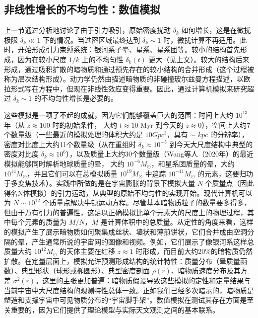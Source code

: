 
 

\subsection{非线性增长的不均匀性：数值模拟}

上一节通过分析地讨论了由于引力吸引，原始密度扰动 \( \delta_k \) 如何增长，这是在微扰极限 \( \delta_k \ll 1 \) 下的情况。当过密区域最终达到 \( \delta_k \sim 1 \) 时，微扰计算不再适用。此时，开始形成引力束缚系统：银河系子晕、星系、星系团等。较小的结构首先形成，因为在较小尺度 \( 1/k \) 上的不均匀性 \( \delta_k(t) \) 更大（见上文）。较大的结构后来形成，通过吸积扩散的暗物质和通过预先存在的较小结构的合并形成（这个过程被称为层次结构形成）。动力学仍然由描述暗物质的非碰撞玻尔兹曼方程描述，以欧拉形式写在方程中，但现在非线性效应变得重要。因此，通过计算机模拟来研究超过 \( \delta_k \sim 1 \) 的不均匀性增长是必要的。

这些模拟是一项了不起的成就，因为它们能够覆盖巨大的范围：时间上大约 \( 10^{13} \) 年（从 \( z \approx 100 \) 时的初始条件，
大约 \( t \approx 10 \) Myr 到今天的 \( z \approx 0 \)），空间上大约7个数量级（一些最近的模拟处理的体积大约是 $10 Gpc^3$，具有 \( \sim \) $kpc$ 的分辨率），密度对比度上大约11个数量级（从在重组时 \( \delta_k \approx 10^{-5} \) 到今天大尺度结构中典型的密度对比度 \( \delta_k \approx 10^6 \)），以及质量上大约30个数量级（Wang等人（2020年）的最近模拟能够同时解析地球质量的晕，
大约 \( 10^{-6} M_{\odot} \)，和星系团质量的晕，大约 \( 10^{14} M_{\odot} \)，并且它们可以在总模拟质量 \( 10^{19} M_{\odot} \) 中追踪 \( 10^{-11} M_{\odot} \) 的元素，这要归功于多变焦技术）。实践中所做的是在宇宙膨胀的背景下模拟大量 \( N \) 个质量点（因此得名N体模拟）的引力运动，从典型的原始不均匀性的实现开始。现代计算机可以为 \( N \sim 10^{12} \) 个质量点解决牛顿运动方程。尽管基本暗物质粒子的数量要多得多，但由于万有引力的普遍性，这足以正确模拟比单个元素大的尺度上的物理过程，其中每个元素的质量为 \( M/N \)，\( M \) 是计算体积中的总质量。从定性的角度来看，这样的模拟产生了展示暗物质如何聚集成丝状、墙状和薄煎饼状，它们合并成由空洞分隔的晕，产生通常所说的宇宙网的图像和视频。例如，它们展示了像银河系这样总质量大约 \( 10^{12} M_{\odot} \) 的天体主要在红移 \( z \approx 1 \) 时形成，而目前大约20\%的暗物质仍然扩散。在定量层面上，模拟允许预测形成结构的统计特性：质量分布（晕质量函数）、典型形状（球形或椭圆形）、典型密度剖面 \( \rho(r) \)、暗物质速度分布及其方差 \( \sigma^2(r) \)。这里的主张更加普遍：暗物质假设导致这些模拟的定性和定量结果与当前宇宙中大尺度结构的观测特性总体一致。正如我们已经多次暗示的，暗物质是塑造和支撑宇宙中可见物质分布的“宇宙脚手架”。数值模拟在测试其存在方面是至关重要的，因为它们提供了理论模型与实际天文观测之间的基本联系。

